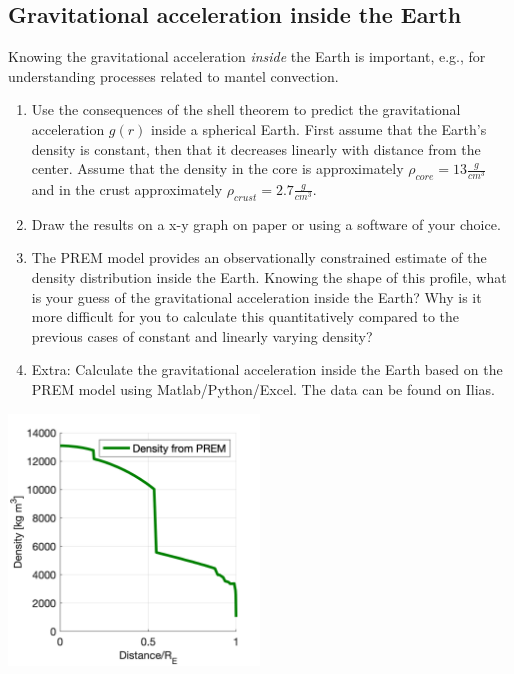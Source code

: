 \documentclass[a4paper,12pt]{article}
\begin{document}
\subsection{Gravitational acceleration inside the Earth}
Knowing the gravitational acceleration \textit{inside} the Earth is important, e.g., for understanding processes related to mantel convection.
\begin{enumerate}[label=(\alph*)]
  \item Use the consequences of the shell theorem to predict the gravitational acceleration $g(r)$ inside a spherical Earth. First assume that the Earth's density is constant, then that it decreases linearly with distance from the center. Assume that the density in the core is approximately $\rho_{core} = 13 \frac{g}{cm^3}$ and in the crust approximately $\rho_{crust} = 2.7 \frac{g}{cm^3}$.

  \item Draw the results on a x-y graph on paper or using a software of your choice.

  \item The PREM model provides an observationally constrained estimate of the density distribution inside the Earth. Knowing the shape of this profile, what is your guess of the gravitational acceleration inside the Earth? Why is it more difficult for you to calculate this quantitatively compared to the previous cases of constant and linearly varying density?

  \item Extra: Calculate the gravitational acceleration inside the Earth based on the PREM model using Matlab/Python/Excel. The data can be found on Ilias.
\end{enumerate}
\begin{center}
    \includegraphics[width=0.5\textwidth]{Figures/Gravimetry/Gravimetry01_PREM.png}
 \end{center}
\end{document}
